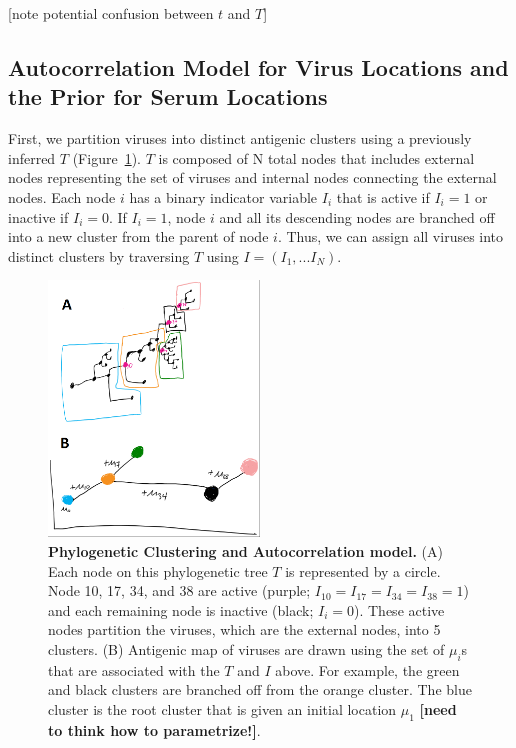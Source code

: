\documentclass[11pt,oneside,letterpaper]{article}
\begin{document}
[note potential confusion between $t$ and $T$]


\subsection*{Autocorrelation Model for Virus Locations and the Prior for Serum Locations}

First, we partition viruses into distinct antigenic clusters using a previously inferred $T$ (Figure~\ref{autocorrelationModel}).
$T$ is composed of N total nodes that includes external nodes representing the set of viruses and internal nodes connecting the external nodes.
Each node $i$ has a binary indicator variable $I_i$ that is active if $I_i=1$ or inactive if $I_i=0$. 
If $I_i=1$, node $i$ and all its descending nodes are branched off into a new cluster from the parent of node $i$.
Thus, we can assign all viruses into distinct clusters by traversing $T$ using $I = (I_1, ... I_N)$.



\begin{figure}[h]
	\centering		
	\includegraphics[width=0.5\textwidth]{figures/autocorrelationModel}
	\caption{\textbf{Phylogenetic Clustering and Autocorrelation model.} 
(A) Each node on this phylogenetic tree $T$ is represented by a circle. 
Node 10, 17, 34, and 38 are active (purple; $I_{10}=I_{17}=I_{34}=I_{38}=1$) and each remaining node is inactive (black; $I_i=0$). 
These active nodes partition the viruses, which are the external nodes, into 5 clusters.
(B) Antigenic map of viruses are drawn using the set of $\mu_i$s that are associated with the $T$ and $I$ above. 
For example, the green and black clusters are branched off from the orange cluster. 
The blue cluster is the root cluster that is given an initial location $\mu_1$  \textbf{[need to think how to parametrize!]}.
	} 
	\label{autocorrelationModel} 
\end{figure}
\end{document}
